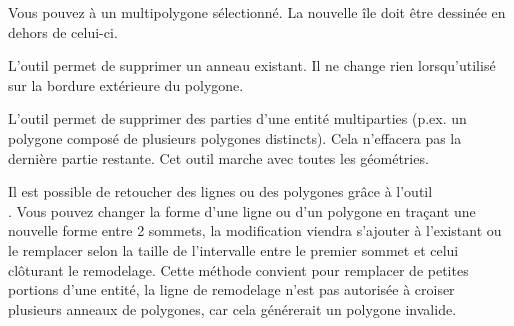 Vous pouvez  à un multipolygone sélectionné. La nouvelle île doit être dessinée en dehors de celui-ci.


L'outil  permet de supprimer un anneau existant. Il ne change rien lorsqu’utilisé sur la bordure extérieure du polygone.


L'outil  permet de supprimer des parties d'une entité multiparties (p.ex. un polygone composé de plusieurs polygones distincts). Cela n'effacera pas la dernière partie restante. Cet outil marche avec toutes les géométries.


Il est possible de retoucher des lignes ou des polygones grâce à l'outil\\ . Vous pouvez changer la forme d'une ligne ou d'un polygone en traçant une nouvelle forme entre 2 sommets, la modification viendra s'ajouter à l'existant ou le remplacer selon la taille de l'intervalle entre le premier sommet et celui clôturant le remodelage. Cette méthode convient pour remplacer de petites portions d'une entité, la ligne de remodelage n'est pas autorisée à croiser plusieurs anneaux de polygones, car cela générerait un polygone invalide.

